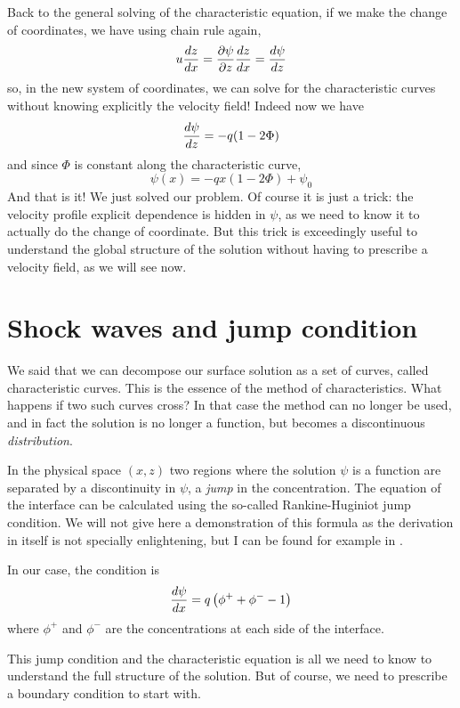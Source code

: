Back to the general solving of the characteristic equation, if we make the change of coordinates, we have using chain rule again,
\begin{equation}
	u\frac{d {z}}{d {x}} = \frac{\partial {\psi}}{\partial {z}} \frac{d {z}}{d {x}} = \frac{d {\psi}}{d {z}}
\end{equation}
so, in the new system of coordinates, we can solve for the characteristic curves without knowing explicitly the velocity field!
Indeed now we have
\begin{equation}
		\frac{d {\psi}}{d {z}} =  - q (1- 2 \Phi)
\end{equation}
and since $\Phi$ is constant along the characteristic curve,
\begin{equation}
	\psi(x) = - q x (1-2\Phi) + \psi_0
\end{equation}
And that is it! We just solved our problem.
Of course it is just a trick: the velocity profile explicit dependence is hidden in $\psi$, as we need to know it to actually do the change of coordinate. But this trick is exceedingly useful to understand the global structure of the solution without having to prescribe a velocity field, as we will see now.

\section{Shock waves and jump condition}
We said that we can decompose our surface solution as a set of curves, called characteristic curves. This is the essence of the method of characteristics. 
What happens if two such curves cross? In that case the method can no longer be used, and in fact the solution is no longer a function, but becomes a discontinuous \textit{distribution}.

In the physical space $(x, z)$  two regions where the solution $\psi$ is a function are separated by a discontinuity in $\psi$, a \textit{jump} in the concentration.
The equation of the interface can be calculated using the so-called Rankine-Huginiot jump condition. We will not give here a demonstration of this formula as the derivation in itself is not specially enlightening, but I can be found for example in \cite{leveque}.

In our case, the condition is
\begin{equation}
	\frac{d {\psi}}{d {x}} = q \left( \phi^+ + \phi^- - 1\right)
\end{equation}
where $\phi^+$ and $\phi^-$ are the concentrations at each side of the interface.

This jump condition and the characteristic equation is all we need to know to understand the full structure of the solution. But of course, we need to prescribe a boundary condition to start with.

